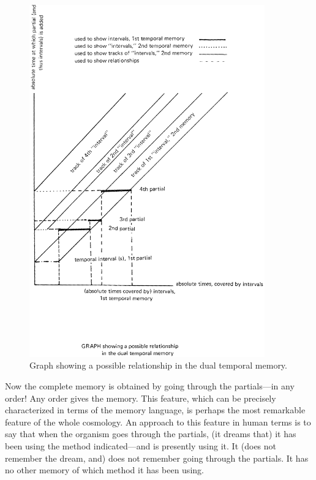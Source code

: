 \begin{figure}
\centering
\includegraphics[width=4in]{img/energycubegraph}
\caption{Graph showing a possible relationship in the dual temporal memory.}
\label{ecubegraph}
\end{figure}


Now the complete memory is obtained by going through the partials---in 
any order! Any order gives the memory. This feature, which can be 
precisely characterized in terms of the memory language, is perhaps the most 
remarkable feature of the whole cosmology. An approach to this feature in 
human terms is to say that when the organism goes through the partials, (it 
dreams that) it has been using the method indicated---and is presently using 
it. It (does not remember the dream, and) does not remember going through 
the partials. It has no other memory of which method it has been using. 

